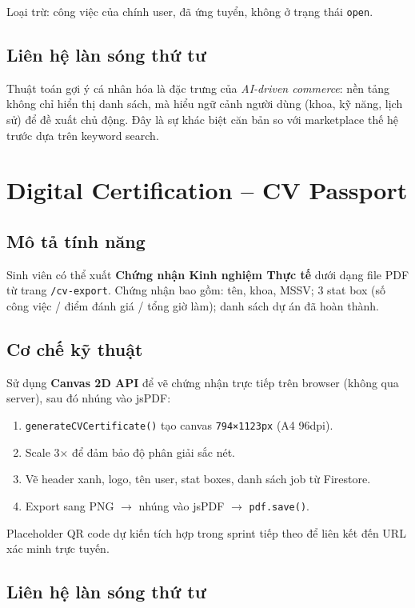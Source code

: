 Loại trừ: công việc của chính user, đã ứng tuyển, không ở trạng thái \texttt{open}.

\subsection*{Liên hệ làn sóng thứ tư}

Thuật toán gợi ý cá nhân hóa là đặc trưng của \textit{AI-driven commerce}: nền tảng không
chỉ hiển thị danh sách, mà hiểu ngữ cảnh người dùng (khoa, kỹ năng, lịch sử) để đề xuất
chủ động. Đây là sự khác biệt căn bản so với marketplace thế hệ trước dựa trên keyword search.

\section{Digital Certification -- CV Passport}

\subsection*{Mô tả tính năng}

Sinh viên có thể xuất \textbf{Chứng nhận Kinh nghiệm Thực tế} dưới dạng file PDF từ
trang \texttt{/cv-export}. Chứng nhận bao gồm: tên, khoa, MSSV; 3 stat box
(số công việc / điểm đánh giá / tổng giờ làm); danh sách dự án đã hoàn thành.

\subsection*{Cơ chế kỹ thuật}

Sử dụng \textbf{Canvas 2D API} để vẽ chứng nhận trực tiếp trên browser (không qua server),
sau đó nhúng vào jsPDF:

\begin{enumerate}
  \item \texttt{generateCVCertificate()} tạo canvas \texttt{794×1123px} (A4 96dpi).
  \item Scale 3× để đảm bảo độ phân giải sắc nét.
  \item Vẽ header xanh, logo, tên user, stat boxes, danh sách job từ Firestore.
  \item Export sang PNG $\rightarrow$ nhúng vào jsPDF $\rightarrow$ \texttt{pdf.save()}.
\end{enumerate}

Placeholder QR code dự kiến tích hợp trong sprint tiếp theo để liên kết đến
URL xác minh trực tuyến.

\subsection*{Liên hệ làn sóng thứ tư}

